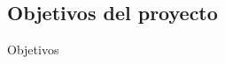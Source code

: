 \documentclass[pdf]{beamer}
\begin{document}


    \subsection{Objetivos del proyecto}

    \begin{frame}{Objetivos}

    \end{frame}

        

\end{document}
